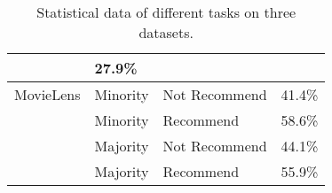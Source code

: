 \documentclass[letterpaper]{article} %
\begin{document}
\begin{table}[t]
\begin{tabular}{llll}
        &27.9\%\\
        \hline
        MovieLens& Minority & Not Recommend %
        &41.4\%\\
        &Minority &	Recommend %
        &58.6\%\\
        &Majority & Not Recommend %
        &44.1\%\\
        &Majority & Recommend %
        &55.9\% \\
        \hline
        \hline
        \end{tabular}
        \caption{Statistical data of different tasks on three datasets.}
    \label{table:statistics}
    \vspace{-5pt}
\end{table}


\end{document}
